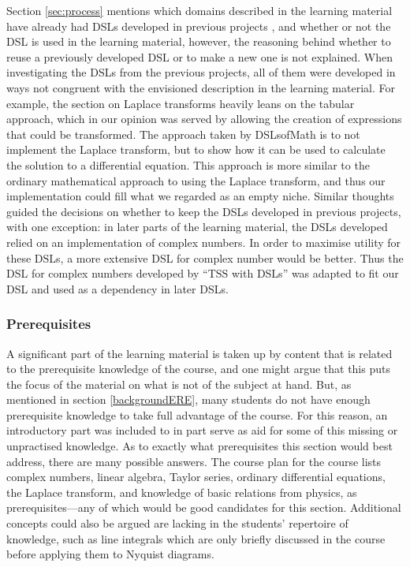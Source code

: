 \begin{newtext}
Section \ref{sec:process} mentions which domains described in the learning material have already had \gls{DSL}s developed in previous projects \cite{dslsofmath,tssarbete}, and whether or not the \gls{DSL} is used in the learning material, however, the reasoning behind whether to reuse a previously developed \gls{DSL} or to make a new one is not explained. 
When investigating the \gls{DSL}s from the previous projects, all of them were developed in ways not congruent with the envisioned description in the learning material. For example, the section on Laplace transforms heavily leans on the tabular approach, which in our opinion was served by allowing the creation of expressions that could be transformed. The approach taken by \gls{DSLsofMath} is to not implement the Laplace transform, but to show how it can be used to calculate the solution to a differential equation. This approach is more similar to the ordinary mathematical approach to using the Laplace transform, and thus our implementation could fill what we regarded as an empty niche. 
Similar thoughts guided the decisions on whether to keep the 
\gls{DSL}s developed in previous projects,
with one exception: in later parts of the learning material, the \gls{DSL}s developed relied on an implementation of complex numbers. In order to maximise utility for these \gls{DSL}s, a more extensive \gls{DSL} for complex number would be better. Thus the \gls{DSL} for complex numbers developed by ``TSS with DSLs'' \cite{tssarbete} was adapted to fit our \gls{DSL} and used as a dependency in later \gls{DSL}s. 
\end{newtext}

\subsubsection{Prerequisites}

A significant part of the learning material is taken up by content that is related to the prerequisite knowledge of the course, and one might argue that this puts the focus of the material on what is not of the subject at hand.
But, as mentioned in section \ref{backgroundERE}, many students do not have enough prerequisite knowledge to take full advantage of the course. For this reason, an introductory part was included to in part serve as aid for some of this missing or unpractised knowledge. As to exactly what prerequisites this section would best address, there are many possible answers. The course plan \cite{ERE103} for the course lists complex numbers, linear algebra, Taylor series, ordinary differential equations, the Laplace transform, and knowledge of basic relations from physics, as prerequisites---any of which would be good candidates for this section. Additional concepts could also be argued are lacking in the students' repertoire of knowledge, such as line integrals which are only briefly discussed in the course before applying them to Nyquist diagrams. 

